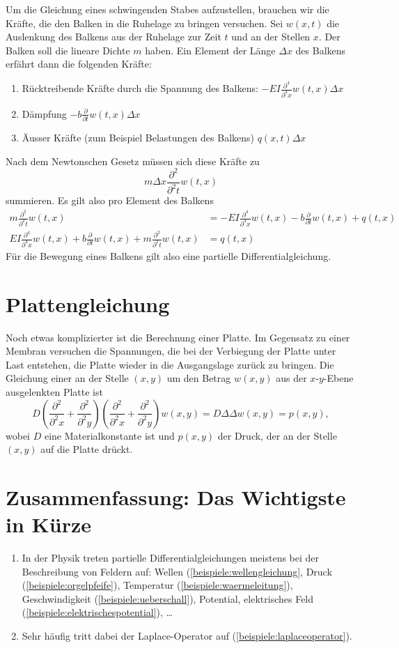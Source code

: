 Um die Gleichung eines schwingenden Stabes aufzustellen, brauchen wir
die Kräfte, die den Balken in die Ruhelage zu bringen versuchen. Sei
$w(x,t)$ die Auslenkung des Balkens aus der Ruhelage zur Zeit $t$
und an der Stellen $x$. Der Balken soll die lineare Dichte $m$ haben.
Ein Element der Länge $\Delta x$ des Balkens erfährt dann die
folgenden Kräfte:
\begin{enumerate}
\item Rücktreibende Kräfte durch die Spannung des Balkens: $-EI\frac{\partial^4}{\partial^4 x}w(t,x)\Delta x$
\item Dämpfung $-b\frac{\partial}{\partial t}w(t,x)\Delta x$
\item Äusser Kräfte (zum Beispiel Belastungen des Balkens) $q(x,t)\Delta x$
\end{enumerate}
Nach dem Newtonschen Gesetz müssen sich diese Kräfte zu
\[
m\Delta x\frac{\partial^2}{\partial^2 t}w(t,x)
\]
summieren. Es gilt also pro Element des Balkens
\begin{align*}
m\frac{\partial^2}{\partial^2t}w(t,x)
&=-EI\frac{\partial^4}{\partial^4x}w(t,x)-b\frac{\partial}{\partial t}w(t,x)+q(t,x)
\\
EI\frac{\partial^4}{\partial^4x}w(t,x)
+b\frac{\partial}{\partial t}w(t,x)
+m\frac{\partial^2}{\partial^2t}w(t,x)
&=q(t,x)
\end{align*}
Für die Bewegung eines Balkens gilt also eine partielle Differentialgleichung.

\section{Plattengleichung\label{beispiele:plattengleichung}}
Noch etwas komplizierter ist die Berechnung einer Platte. Im Gegensatz
zu einer Membran versuchen die Spannungen, die bei der Verbiegung der
Platte unter Last entstehen, die Platte wieder in die Ausgangslage zurück
zu bringen. Die Gleichung einer an der Stelle $(x,y)$ um den Betrag
$w(x,y)$ aus der $x$-$y$-Ebene ausgelenkten Platte ist
\[
D\left(
\frac{\partial^2}{\partial^2 x}
+
\frac{\partial^2}{\partial^2 y}
\right)
\left(
\frac{\partial^2}{\partial^2 x}
+
\frac{\partial^2}{\partial^2 y}
\right)
w(x,y)
=D\Delta\Delta w(x,y)
=p(x,y),
\]
wobei $D$ eine Materialkonstante ist und $p(x,y)$ der Druck, der
an der Stelle $(x,y)$ auf die Platte drückt.

\section{Zusammenfassung: Das Wichtigste in Kürze\label{beispiele:zusammenfassung}}
\begin{enumerate}
\item In der Physik treten partielle Differentialgleichungen meistens
bei der Beschreibung von Feldern auf: Wellen (\ref{beispiele:wellengleichung},
Druck (\ref{beispiele:orgelpfeife}),
Temperatur (\ref{beispiele:waermeleitung}),
Geschwindigkeit (\ref{beispiele:ueberschall}), Potential,
elektrisches Feld (\ref{beispiele:elektrischespotential}), \dots
\item Sehr häufig tritt dabei der Laplace-Operator auf (\ref{beispiele:laplaceoperator}).
\end{enumerate}

